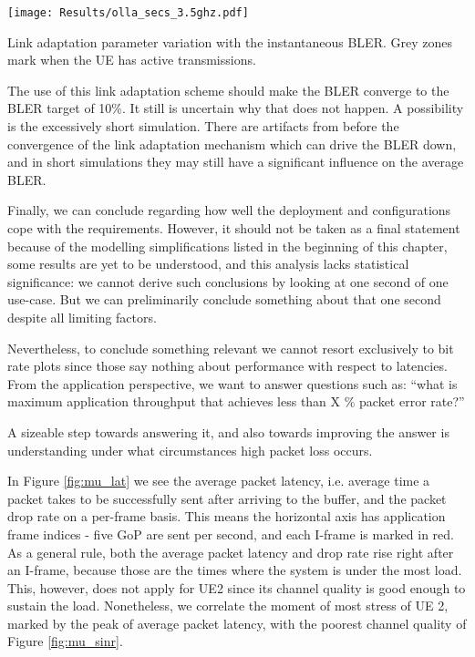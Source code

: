 \begin{center}

    \hfill \texttt{[image: Results/olla\_secs\_3.5ghz.pdf]}
    \captionsetup{type=figure} 
    \vspace{-3mm}   
    \caption{Link adaptation parameter variation with the instantaneous \acs{BLER}. Grey zones mark when the UE has active transmissions.}			
    \label{fig:mu_olla}
    
\end{center}


The use of this link adaptation scheme should make the BLER converge to the BLER target of 10\%. It still is uncertain why that does not happen. A possibility is the excessively short simulation. There are artifacts from before the convergence of the link adaptation mechanism which can drive the BLER down, and in short simulations they may still have a significant influence on the average BLER.

Finally, we can conclude regarding how well the deployment and configurations cope with the requirements. However, it should not be taken as a final statement because of the modelling simplifications listed in the beginning of this chapter, some results are yet to be understood, and this analysis lacks statistical significance: we cannot derive such conclusions by looking at one second of one use-case. But we can preliminarily conclude something about that one second despite all limiting factors.

Nevertheless, to conclude something relevant we cannot resort exclusively to bit rate plots since those say nothing about performance with respect to latencies. From the application perspective, we want to answer questions such as: ``what is maximum application throughput that achieves less than X \% packet error rate?''

A sizeable step towards answering it, and also towards improving the answer is understanding under what circumstances high packet loss occurs. 

In Figure \ref{fig:mu_lat} we see the average packet latency, i.e. average time a packet takes to be successfully sent after arriving to the buffer, and the packet drop rate on a per-frame basis. This means the horizontal axis has application frame indices - five GoP are sent per second, and each I-frame is marked in red. As a general rule, both the average packet latency and drop rate rise right after an I-frame, because those are the times where the system is under the most load. This, however, does not apply for UE2 since its channel quality is good enough to sustain the load. Nonetheless, we correlate the moment of most stress of UE 2, marked by the peak of average packet latency, with the poorest channel quality of Figure \ref{fig:mu_sinr}.

